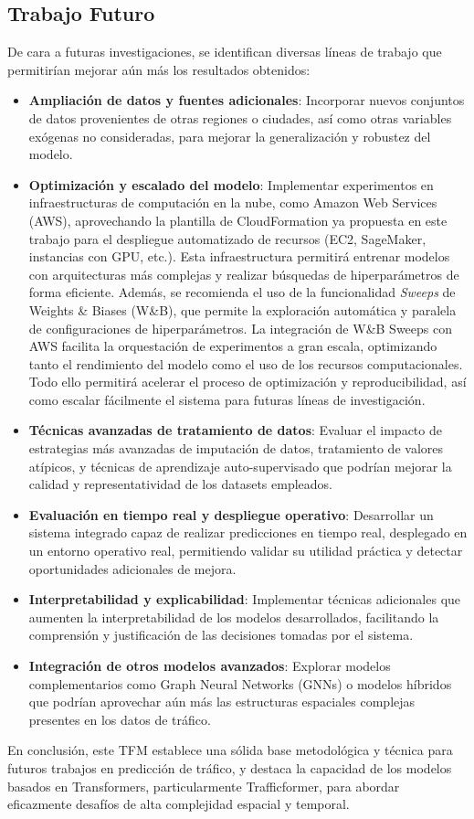 \subsection{Trabajo Futuro}

De cara a futuras investigaciones, se identifican diversas líneas de trabajo que permitirían mejorar aún más los resultados obtenidos:

\begin{itemize}
	\item \textbf{Ampliación de datos y fuentes adicionales}: Incorporar nuevos conjuntos de datos provenientes de otras regiones o ciudades, así como otras variables exógenas no consideradas, para mejorar la generalización y robustez del modelo.
	\item \textbf{Optimización y escalado del modelo}: Implementar experimentos en infraestructuras de computación en la nube, como Amazon Web Services (AWS), aprovechando la plantilla de CloudFormation ya propuesta en este trabajo para el despliegue automatizado de recursos (EC2, SageMaker, instancias con GPU, etc.). Esta infraestructura permitirá entrenar modelos con arquitecturas más complejas y realizar búsquedas de hiperparámetros de forma eficiente. 
	Además, se recomienda el uso de la funcionalidad \textit{Sweeps} de Weights \& Biases (W\&B), que permite la exploración automática y paralela de configuraciones de hiperparámetros. La integración de W\&B Sweeps con AWS facilita la orquestación de experimentos a gran escala, optimizando tanto el rendimiento del modelo como el uso de los recursos computacionales. Todo ello permitirá acelerar el proceso de optimización y reproducibilidad, así como escalar fácilmente el sistema para futuras líneas de investigación.
	\item \textbf{Técnicas avanzadas de tratamiento de datos}: Evaluar el impacto de estrategias más avanzadas de imputación de datos, tratamiento de valores atípicos, y técnicas de aprendizaje auto-supervisado que podrían mejorar la calidad y representatividad de los datasets empleados.
	\item \textbf{Evaluación en tiempo real y despliegue operativo}: Desarrollar un sistema integrado capaz de realizar predicciones en tiempo real, desplegado en un entorno operativo real, permitiendo validar su utilidad práctica y detectar oportunidades adicionales de mejora.
	\item \textbf{Interpretabilidad y explicabilidad}: Implementar técnicas adicionales que aumenten la interpretabilidad de los modelos desarrollados, facilitando la comprensión y justificación de las decisiones tomadas por el sistema.
	\item \textbf{Integración de otros modelos avanzados}: Explorar modelos complementarios como Graph Neural Networks (GNNs) o modelos híbridos que podrían aprovechar aún más las estructuras espaciales complejas presentes en los datos de tráfico.
\end{itemize}

En conclusión, este TFM establece una sólida base metodológica y técnica para futuros trabajos en predicción de tráfico, y destaca la capacidad de los modelos basados en Transformers, particularmente Trafficformer, para abordar eficazmente desafíos de alta complejidad espacial y temporal.


